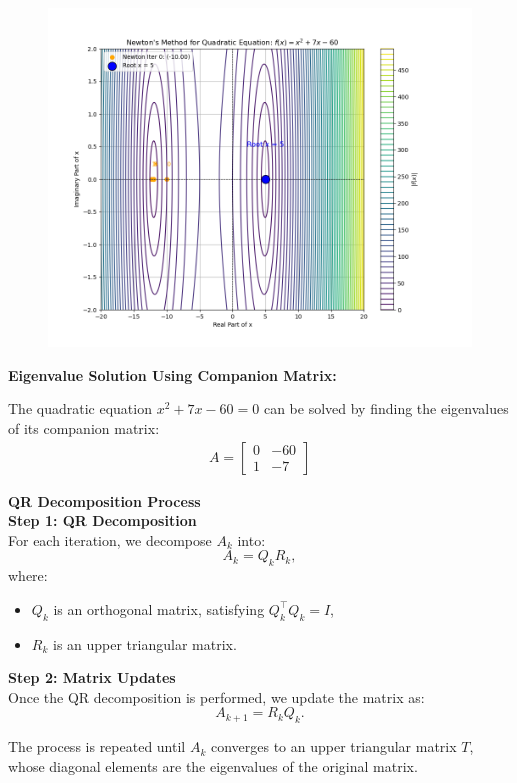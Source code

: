 \documentclass[journal]{IEEEtran}
\begin{document}
	\begin{figure}[h]
	\centering
	\includegraphics[width=\textwidth]{figs/fig2.png}
	\end{figure}
	
	\textbf{Eigenvalue Solution Using Companion Matrix:}
	
	The quadratic equation \(x^2 + 7x - 60 = 0\) can be solved by finding the eigenvalues of its companion matrix:
	\begin{align}
		A = \begin{bmatrix}
			0 & -60 \\
			1 & -7
		\end{bmatrix}
	\end{align}
	
	\textbf{QR Decomposition Process}\\
	
	\textbf{Step 1: QR Decomposition}\\
	For each iteration, we decompose \( A_k \) into:
	\[
	A_k = Q_k R_k,
	\]
	where:
	\begin{itemize}
		\item \( Q_k \) is an orthogonal matrix, satisfying \( Q_k^\top Q_k = I \),
		\item \( R_k \) is an upper triangular matrix.
	\end{itemize}
	
	\textbf{Step 2: Matrix Updates}\\
	Once the QR decomposition is performed, we update the matrix as:
	\[
	A_{k+1} = R_k Q_k.
	\]
	
	The process is repeated until \( A_k \) converges to an upper triangular matrix \( T \), whose diagonal elements are the eigenvalues of the original matrix.
	
\end{document}
